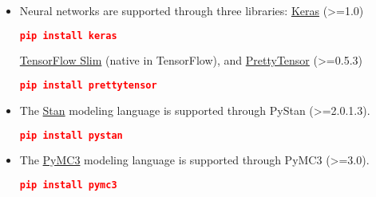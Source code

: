 \begin{itemize}
  \item Neural networks are supported through three
  libraries:
  \href{http://keras.io}{Keras} (>=1.0)
\begin{lstlisting}[language=JSON]
pip install keras
\end{lstlisting}
\href{https://github.com/tensorflow/tensorflow/tree/master/tensorflow/contrib/slim}{TensorFlow
Slim} (native in TensorFlow), and
\href{https://github.com/google/prettytensor}{PrettyTensor} (>=0.5.3)
\begin{lstlisting}[language=JSON]
pip install prettytensor
\end{lstlisting}
  \item The \href{http://mc-stan.org}{Stan} modeling language is supported
  through PyStan (>=2.0.1.3).
\begin{lstlisting}[language=JSON]
pip install pystan
\end{lstlisting}
  \item The \href{http://pymc-devs.github.io/pymc3/}{PyMC3} modeling language is supported
  through PyMC3 (>=3.0).
\begin{lstlisting}[language=JSON]
pip install pymc3
\end{lstlisting}
\end{itemize}
